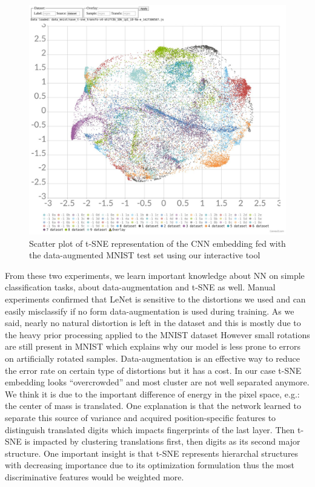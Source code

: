 \documentclass[a4paper,12pt]{report}
\newcommand{\eg}{e.g.}
\begin{document}
\begin{figure}[t]
    \begin{center}
        \includegraphics[width=\textwidth]{thesis_figures/mnist_da_tsne.jpg}
    \end{center}
    \caption{Scatter plot of t-SNE representation of the CNN embedding fed with the data-augmented MNIST test set using our interactive tool}
    \label{fig:mnist_da_tsne}
\end{figure}

From these two experiments, we learn important knowledge about NN on simple classification tasks, about data-augmentation and t-SNE as well.
Manual experiments confirmed that LeNet is sensitive to the distortions we used and can easily misclassify if no form data-augmentation is used during training.
As we said, nearly no natural distortion is left in the dataset and this is mostly due to the heavy prior processing applied to the MNIST dataset
However small rotations are still present in MNIST which explains why our model is less prone to errors on artificially rotated samples.
Data-augmentation is an effective way to reduce the error rate on certain type of distortions but it has a cost.
In our case t-SNE embedding looks ``overcrowded'' and most cluster are not well separated anymore.
We think it is due to the important difference of energy in the pixel space, \eg: the center of mass is translated.
One explanation is that the network learned to separate this source of variance and acquired position-specific features to distinguish translated digits which impacts fingerprints of the last layer.
Then t-SNE is impacted by clustering translations first, then digits as its second major structure.
One important insight is that t-SNE represents hierarchal structures with decreasing importance due to its optimization formulation thus the most discriminative features would be weighted more.
\end{document}
